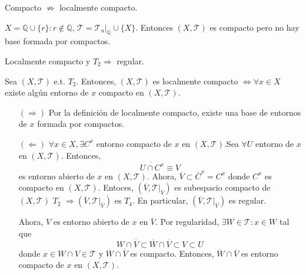 \begin{obs}
  Compacto $\not \Rightarrow$ localmente compacto.
\end{obs}

\begin{ejm}
  $X = \mathbb{Q} \cup \{ r \} : r \not \in \mathbb{Q}$, $\mathcal{T} = \mathcal{T}_{u}|_{\mathbb{Q}} \cup \{ X \}$. Entonces $( X, \mathcal{T} )$ es compacto pero no hay base formada por compactos.
\end{ejm}

\begin{obs}
  Localmente compacto y $T_{2} \Rightarrow$ regular.
\end{obs}

\begin{prop}
  Sea $( X, \mathcal{T} )$ e.t. $T_{2}$. Entonces, $( X, \mathcal{T} )$ es localmente compacto $\Leftrightarrow \forall x \in X$ existe algún entorno de $x$ compacto en $( X, \mathcal{T} )$.
\end{prop}

\begin{dem}
  \begin{enumerate}[label=(\roman*)]
    \item []
    \item [$(\Rightarrow)$] Por la definición de localmente compacto, existe una base de entornos de $x$ formada por compactos.
    \item [$(\Leftarrow)$] $\forall x \in X, \exists C^{x}$ entorno compacto de $x$ en $( X, \mathcal{T} )$.Sea $\forall U$ entorno de $x$ en $( X, \mathcal{T} )$. Entonces,
      \[ 
        \mathring{U \cap C^{x}} \equiv V 
      \] 
      es entorno abierto de $x$ en $( X, \mathcal{T} )$. Ahora, $\overline{V} \subset \overline{C}^{x} = C^{x}$ donde $C^{x}$ es compacto en $( X, \mathcal{T} )$. Entoces, $( \overline{V}, \mathcal{T}|_{\overline{V}})$ es subespacio compacto de $( X, \mathcal{T} )$ $T_{2}$ $\Rightarrow ( \overline{V}, \mathcal{T}|_{\overline{V}})$ es $T_{4}$. En particular, $ ( \overline{V}, \mathcal{T}|_{\overline{V}})$ es regular.

      Ahora, $V$ es entorno abierto de $x$ en $\overline{V}$. Por regularidad, $\exists W \in \mathcal{T} : x \in W$ tal que
      \[ 
        W \cap \overline{V} \subset \overline{W} \cap \overline{V} \subset V \subset U 
      \] 
      donde $x \in W \cap V \in \mathcal{T}$ y $\overline{W} \cap \overline{V}$ es compacto. Entonces, $\overline{W} \cap \overline{V}$ es entorno compacto de $x$ en $( X, \mathcal{T} )$.
  \end{enumerate}
\end{dem}

